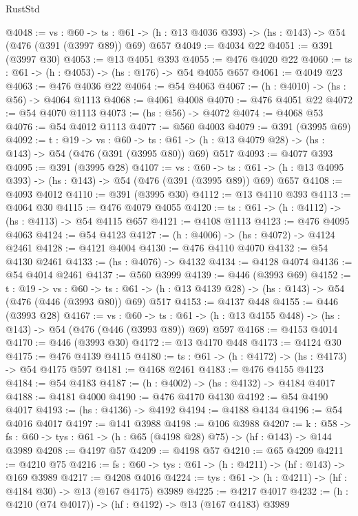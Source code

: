 \begin{lexlean}{RustStd}
\begin{coremodule}
@4048 := {vs : @60} ->
  {ts : @61} -> (h : @13 @4036 @393) -> (hs : @143) -> @54 (@476 (@391 (@3997 @89)) @69) @657
@4049 := @4034 @22
@4051 := @391 (@3997 @30)
@4053 := @13 @4051 @393
@4055 := @476 @4020 @22
@4060 := {ts : @61} -> (h : @4053) -> (hs : @176) -> @54 @4055 @657
@4061 := @4049 @23
@4063 := @476 @4036 @22
@4064 := @54 @4063
@4067 := (h : @4010) -> (hs : @56) -> @4064 @1113
@4068 := @4061 @4008
@4070 := @476 @4051 @22
@4072 := @54 @4070 @1113
@4073 := (hs : @56) -> @4072
@4074 := @4068 @53
@4076 := @54 @4012 @1113
@4077 := @560 @4003
@4079 := @391 (@3995 @69)
@4092 := {t : @19} ->
  {vs : @60} ->
  {ts : @61} -> (h : @13 @4079 @28) -> (hs : @143) -> @54 (@476 (@391 (@3995 @80)) @69) @517
@4093 := @4077 @393
@4095 := @391 (@3995 @28)
@4107 := {vs : @60} ->
  {ts : @61} -> (h : @13 @4095 @393) -> (hs : @143) -> @54 (@476 (@391 (@3995 @89)) @69) @657
@4108 := @4093 @4012
@4110 := @391 (@3995 @30)
@4112 := @13 @4110 @393
@4113 := @4064 @30
@4115 := @476 @4079 @4055
@4120 := {ts : @61} -> (h : @4112) -> (hs : @4113) -> @54 @4115 @657
@4121 := @4108 @1113
@4123 := @476 @4095 @4063
@4124 := @54 @4123
@4127 := (h : @4006) -> (hs : @4072) -> @4124 @2461
@4128 := @4121 @4004
@4130 := @476 @4110 @4070
@4132 := @54 @4130 @2461
@4133 := (hs : @4076) -> @4132
@4134 := @4128 @4074
@4136 := @54 @4014 @2461
@4137 := @560 @3999
@4139 := @446 (@3993 @69)
@4152 := {t : @19} ->
  {vs : @60} ->
  {ts : @61} -> (h : @13 @4139 @28) -> (hs : @143) -> @54 (@476 (@446 (@3993 @80)) @69) @517
@4153 := @4137 @448
@4155 := @446 (@3993 @28)
@4167 := {vs : @60} ->
  {ts : @61} -> (h : @13 @4155 @448) -> (hs : @143) -> @54 (@476 (@446 (@3993 @89)) @69) @597
@4168 := @4153 @4014
@4170 := @446 (@3993 @30)
@4172 := @13 @4170 @448
@4173 := @4124 @30
@4175 := @476 @4139 @4115
@4180 := {ts : @61} -> (h : @4172) -> (hs : @4173) -> @54 @4175 @597
@4181 := @4168 @2461
@4183 := @476 @4155 @4123
@4184 := @54 @4183
@4187 := (h : @4002) -> (hs : @4132) -> @4184 @4017
@4188 := @4181 @4000
@4190 := @476 @4170 @4130
@4192 := @54 @4190 @4017
@4193 := (hs : @4136) -> @4192
@4194 := @4188 @4134
@4196 := @54 @4016 @4017
@4197 := @141 @3988
@4198 := @106 @3988
@4207 := {k : @58} ->
  {fs : @60} -> {tys : @61} -> (h : @65 (@4198 @28) @75) -> (hf : @143) -> @144 @3989
@4208 := @4197 @57
@4209 := @4198 @57
@4210 := @65 @4209
@4211 := @4210 @75
@4216 := {fs : @60} -> {tys : @61} -> (h : @4211) -> (hf : @143) -> @169 @3989
@4217 := @4208 @4016
@4224 := {tys : @61} -> (h : @4211) -> (hf : @4184 @30) -> @13 (@167 @4175) @3989
@4225 := @4217 @4017
@4232 := (h : @4210 (@74 @4017)) -> (hf : @4192) -> @13 (@167 @4183) @3989

\end{coremodule}
\end{lexlean}
